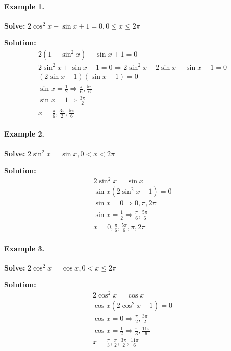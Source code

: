 \documentclass{article}
\begin{document}
\paragraph{Example 1.}
\textbf{Solve:} $2\cos^{2}x - \sin x + 1=0, 0 \leq x \leq 2\pi$

{\scriptsize \textbf{Solution:}}
\[
  \begin{aligned}
    2(1 - \sin^{2}x) - \sin x + 1 = 0 \\
    2\sin^{2}x + \sin x - 1 = 0 \Rightarrow 2\sin^{2}x + 2\sin x - \sin x - 1 = 0 \\
    (2\sin x - 1)(\sin x + 1) = 0 \\
    \sin x = \frac{1}{2} \Rightarrow \frac{\pi}{6}, \frac{5\pi}{6} \\
    \sin x = 1 \Rightarrow \frac{3\pi}{2} \\
    x = \frac{\pi}{6}, \frac{3\pi}{2}, \frac{5\pi}{6}
  \end{aligned}
\]

\paragraph{Example 2.}
\textbf{Solve:} $2\sin^{2}x = \sin x, 0 < x < 2\pi$

{\scriptsize \textbf{Solution:}}
\[
  \begin{aligned}
    2\sin^{2}x = \sin x \\
    \sin x(2\sin^{2}x - 1) = 0 \\
    \sin x = 0 \Rightarrow 0, \pi, 2\pi \\
    \sin x = \frac{1}{2} \Rightarrow \frac{\pi}{6}, \frac{5\pi}{6} \\
    x = 0, \frac{\pi}{6}, \frac{5\pi}{6}, \pi, 2\pi
  \end{aligned}
\]

\paragraph{Example 3.}
\textbf{Solve:} $2\cos^{2}x = \cos x, 0 < x \leq 2\pi$

{\scriptsize \textbf{Solution:}}
\[
  \begin{aligned}
    2\cos^{2}x = \cos x \\
    \cos x(2\cos^{2}x - 1) = 0 \\
    \cos x = 0 \Rightarrow \frac{\pi}{2}, \frac{3\pi}{2} \\
    \cos x = \frac{1}{2} \Rightarrow \frac{\pi}{3}, \frac{11\pi}{6} \\
    x = \frac{\pi}{3}, \frac{\pi}{2}, \frac{3\pi}{2}, \frac{11\pi}{6}
  \end{aligned}
\]
\end{document}
